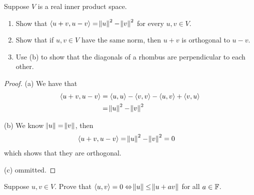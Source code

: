 \documentclass{extarticle}
\begin{document}
\begin{problem}{5}
    Suppose \(V\) is a real inner product space. 
    \begin{enumerate}[label=(\alph*)]
        \item Show that \(\langle u+v,u-v \rangle = \norm{u}^2 - \norm{v}^2\) for every \(u, v \in V\). 
        \item Show that if \(u, v \in V\) have the same norm, then \(u + v\) is orthogonal to \(u - v\). 
        \item Use (b) to show that the diagonals of a rhombus are perpendicular to each other.
    \end{enumerate}
\end{problem}


\begin{proof}
(a) We have that 
\begin{align*}
    \langle u + v,u - v \rangle 
    &= \langle u,u \rangle - \langle v,v \rangle - \langle u,v \rangle + \langle v,u \rangle \\ 
    &= \norm{u}^2 - \norm{v}^2
\end{align*}

(b) We know \(\norm{u} = \norm{v}\), then 
\begin{align*}
    \langle u+v,u-v \rangle 
    &= \norm{u}^2 - \norm{v}^2 = 0
\end{align*}
which shows that they are orthogonal. 

(c) ommitted.
\end{proof}


\begin{problem}{6}
    Suppose \(u, v \in V\). Prove that \(\langle u,v \rangle = 0 \Leftrightarrow \norm{u} \leq \norm{u 
    + av}\) for all \(a \in \mathbb{F}\).
\end{problem}
\end{document}
